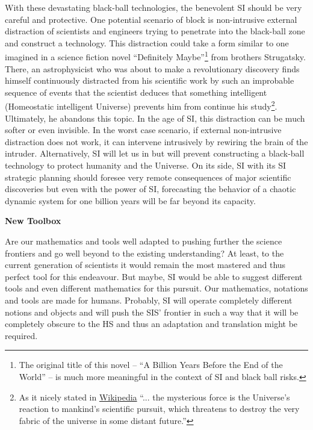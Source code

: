 \documentclass[a4paper,11pt]{article}
\begin{document}
With these devastating black-ball technologies, the benevolent SI should be very careful and protective. One potential scenario of block is non-intrusive external distraction of scientists and engineers trying to penetrate into the black-ball zone and construct a technology. This distraction could take a form similar to one imagined in a science fiction novel ``Definitely Maybe''\footnote{The original title of this novel -- ``A Billion Years Before the End of the World'' -- is much more meaningful in the context of SI and black ball risks.} from brothers Strugatsky. There, an astrophysicist who was about to make a revolutionary discovery finds himself continuously distracted from his scientific work by such an improbable sequence of events that the scientist deduces that something intelligent (Homeostatic intelligent Universe) prevents him from continue his study\footnote{As it nicely stated in \href{https://en.wikipedia.org/wiki/Definitely_Maybe_(novel)}{Wikipedia} ``... the mysterious force is the Universe's reaction to mankind's scientific pursuit, which threatens to destroy the very fabric of the universe in some distant future.''}. Ultimately, he abandons this topic. In the age of SI, this distraction can be much softer or even invisible. In the worst case scenario, if external non-intrusive distraction does not work, it can intervene intrusively by rewiring the brain of the intruder. Alternatively, SI will let us in but will prevent constructing a black-ball technology to protect humanity and the Universe. On its side, SI with its SI strategic planning should foresee very remote consequences of major scientific discoveries but even with the power of SI, forecasting the behavior of a chaotic dynamic system for one billion years will be far beyond its capacity.


\textbf{New Toolbox}

Are our mathematics and tools well adapted to pushing further the science frontiers and go well beyond to the existing understanding? At least, to the current generation of scientists it would remain the most mastered and thus perfect tool for this endeavour. But maybe, SI would be able to suggest different tools and even different mathematics for this pursuit. Our mathematics, notations and tools are made for humans. Probably, SI will operate completely different notions and objects and will push the SIS' frontier in such a way that it will be completely obscure to the HS and thus an adaptation and translation might be required.
\end{document}
